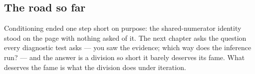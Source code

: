 \cleardoublepage
\begin{narrative}
\section*{The road so far}


\noindent Conditioning ended one step short on purpose: the shared-numerator identity stood on the page with nothing asked of it. The next chapter asks the question every diagnostic test asks — you saw the evidence; which way does the inference run? — and the answer is a division so short it barely deserves its fame. What deserves the fame is what the division does under iteration.
\end{narrative}
